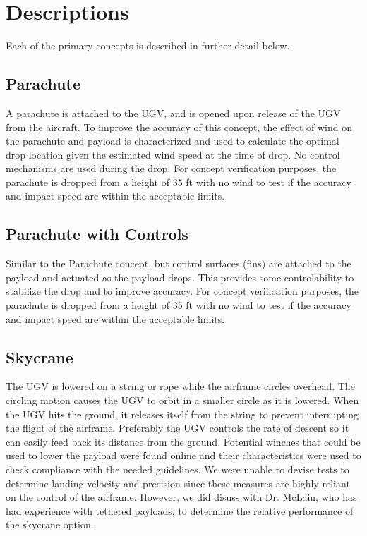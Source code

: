\documentclass[]{auvsi_doc}
\begin{document}
\begin{AUVSITitlePage}
\begin{artifacttable}
\end{artifacttable}
\end{AUVSITitlePage}


\section{Descriptions}
Each of the primary concepts is described in further detail below. 

\subsection{Parachute}
A parachute is attached to the UGV, and is opened upon release of the UGV from the aircraft. To improve the accuracy of this concept, the effect of wind on the parachute and payload is characterized and used to calculate the optimal drop location given the estimated wind speed at the time of drop. No control mechanisms are used during the drop. For concept verification purposes, the parachute is dropped from a height of 35 ft with no wind to test  if the accuracy and impact speed are within the acceptable limits.

\subsection{Parachute with Controls}
Similar to the Parachute concept, but control surfaces (fins) are attached to the payload and actuated as the payload drops. This provides some controlability to stabilize the drop and to improve accuracy. For concept verification purposes, the parachute is dropped from a height of 35 ft with no wind to test  if the accuracy and impact speed are within the acceptable limits.

\subsection{Skycrane}
The UGV is lowered on a string or rope while the airframe circles overhead. The circling motion causes the UGV to orbit in a smaller circle as it is lowered. When the UGV hits the ground, it releases itself from the string to prevent interrupting the flight of the airframe. Preferably the UGV controls the rate of descent so it can easily feed back its distance from the ground. Potential winches that could be used to lower the payload were found online and their characteristics were used to check compliance with the needed guidelines. We were unable to devise tests to determine landing velocity and precision since these measures are highly reliant on the control of the airframe. However, we did disuss with Dr. McLain, who has had experience with tethered payloads, to determine the relative performance of the skycrane option.
\end{document}
